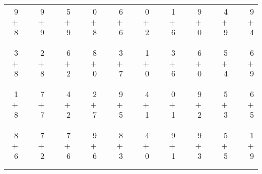 \documentclass[12pt, letterpaper]{article}
\begin{document}
\begin{tabular}{rrrrrrrrrrrrrrrrrrr}
9 & & 9 & & 5 & & 0 & & 6 & & 0 & & 1 & & 9 & & 4 & & 9\\
$+$ 8 & & $+$ 9 & & $+$ 9 & & $+$ 8 & & $+$ 6 & & $+$ 2 & & $+$ 6 & & $+$ 0 & & $+$ 9 & & $+$ 4\\
\cline{1-1} \cline{3-3} \cline{5-5} \cline{7-7} \cline{9-9} \cline{11-11} \cline{13-13} \cline{15-15} \cline{17-17} \cline{19-19} \\ \\
3 & & 2 & & 6 & & 8 & & 3 & & 1 & & 3 & & 6 & & 5 & & 6\\
$+$ 8 & & $+$ 8 & & $+$ 2 & & $+$ 0 & & $+$ 7 & & $+$ 0 & & $+$ 6 & & $+$ 0 & & $+$ 4 & & $+$ 9\\
\cline{1-1} \cline{3-3} \cline{5-5} \cline{7-7} \cline{9-9} \cline{11-11} \cline{13-13} \cline{15-15} \cline{17-17} \cline{19-19} \\ \\
1 & & 7 & & 4 & & 2 & & 9 & & 4 & & 0 & & 9 & & 5 & & 6\\
$+$ 8 & & $+$ 7 & & $+$ 2 & & $+$ 7 & & $+$ 5 & & $+$ 1 & & $+$ 1 & & $+$ 2 & & $+$ 3 & & $+$ 5\\
\cline{1-1} \cline{3-3} \cline{5-5} \cline{7-7} \cline{9-9} \cline{11-11} \cline{13-13} \cline{15-15} \cline{17-17} \cline{19-19} \\ \\
8 & & 7 & & 7 & & 9 & & 8 & & 4 & & 9 & & 9 & & 5 & & 1\\
$+$ 6 & & $+$ 2 & & $+$ 6 & & $+$ 6 & & $+$ 3 & & $+$ 0 & & $+$ 1 & & $+$ 3 & & $+$ 5 & & $+$ 9\\
\cline{1-1} \cline{3-3} \cline{5-5} \cline{7-7} \cline{9-9} \cline{11-11} \cline{13-13} \cline{15-15} \cline{17-17} \cline{19-19} \\ \\
\end{tabular}
\newpage
\end{document}
